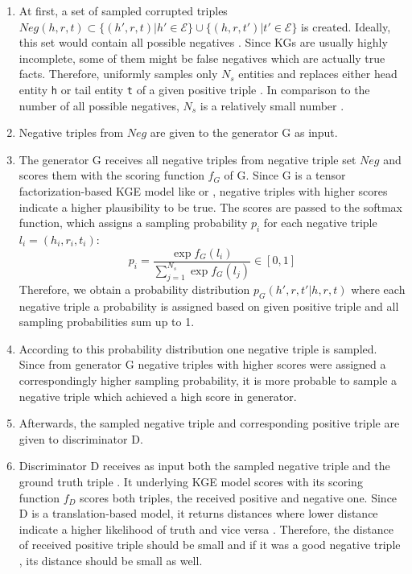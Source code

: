 \begin{enumerate}
    \item 
    At first, a set of sampled corrupted triples $Neg(h,r,t)\subset\{(h',r,t)|h'\in\mathcal{E}\}\cup\{(h,r,t')|t'\in\mathcal{E}\}$ is created.
    Ideally, this set would contain all possible negatives \cite{cai2017kbgan}.
    Since \acp{KG} are usually highly incomplete, some of them might be false negatives which are actually true facts.
    Therefore, \kbgan uniformly samples only $N_s$ entities and replaces either head entity \texttt{h} or tail entity \texttt{t} of a given positive triple .
    In comparison to the number of all possible negatives, $N_s$ is a relatively small number \cite{cai2017kbgan}.
    
    \item 
    Negative triples from $Neg$ are given to the generator G as input.
    
    \item 
    The generator G receives all negative triples from negative triple set $Neg$ and scores them with the scoring function $f_G$ of G.
    Since G is a tensor factorization-based \ac{KGE} model like \distmult or \complex, negative triples with higher scores indicate a higher plausibility to be true.
    The scores are passed to the softmax function, which assigns a sampling probability $p_i$ for each negative triple $l_i = (h_i, r_i, t_i)$:
    \begin{equation} \label{eq:origsampling}
        p_i = \frac{\exp{f_G(l_i)}}{\sum_{j=1}^{N_s}{\exp{f_G(l_j)}}} \in [0,1]
    \end{equation}
    Therefore, we obtain a probability distribution $p_G(h',r,t'|h,r,t)$ where each negative triple  a probability is assigned based on given positive triple  and all sampling probabilities sum up to 1.
    
    \item
    According to this probability distribution one negative triple is sampled.
    Since from generator G negative triples with higher scores were assigned a correspondingly higher sampling probability, it is more probable to sample a negative triple which achieved a high score in generator.

    \item 
    Afterwards, the sampled negative triple  and corresponding positive triple  are given to discriminator D.
    
    \item 
    Discriminator D receives as input both the sampled negative triple  and the ground truth triple .
    It underlying \ac{KGE} model scores with its scoring function $f_D$ scores both triples, the received positive and negative one.
    Since D is a translation-based model, it returns distances where lower distance indicate a higher likelihood of truth and vice versa \cite{cai2017kbgan}.
    Therefore, the distance of received positive triple  should be small and if it was a good negative triple  , its distance should be small as well.
     

\end{enumerate}
